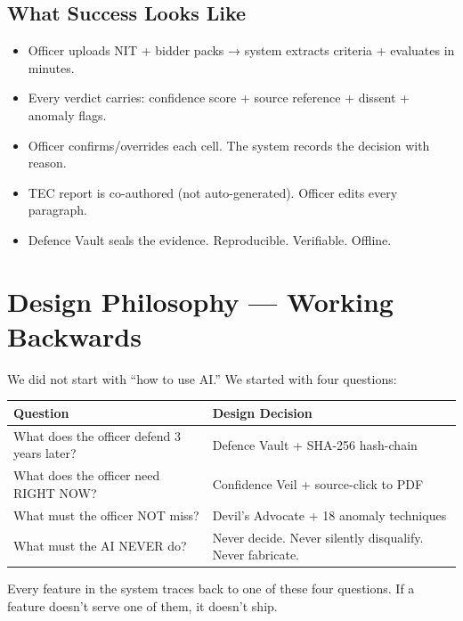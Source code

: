 \documentclass[11pt,a4paper]{article}
\begin{document}
\subsection{What Success Looks Like}

\begin{itemize}[nosep]
    \item Officer uploads NIT + bidder packs → system extracts criteria + evaluates in minutes.
    \item Every verdict carries: confidence score + source reference + dissent + anomaly flags.
    \item Officer confirms/overrides each cell. The system records the decision with reason.
    \item TEC report is co-authored (not auto-generated). Officer edits every paragraph.
    \item Defence Vault seals the evidence. Reproducible. Verifiable. Offline.
\end{itemize}

\section{Design Philosophy — Working Backwards}

We did not start with ``how to use AI.'' We started with four questions:

\begin{center}
\begin{tabular}{p{6cm}p{7cm}}
\toprule
\textbf{Question} & \textbf{Design Decision} \\
\midrule
What does the officer defend 3 years later? & Defence Vault + SHA-256 hash-chain \\
What does the officer need RIGHT NOW? & Confidence Veil + source-click to PDF \\
What must the officer NOT miss? & Devil's Advocate + 18 anomaly techniques \\
What must the AI NEVER do? & Never decide. Never silently disqualify. Never fabricate. \\
\bottomrule
\end{tabular}
\end{center}

Every feature in the system traces back to one of these four questions. If a feature doesn't serve one of them, it doesn't ship.
\end{document}
